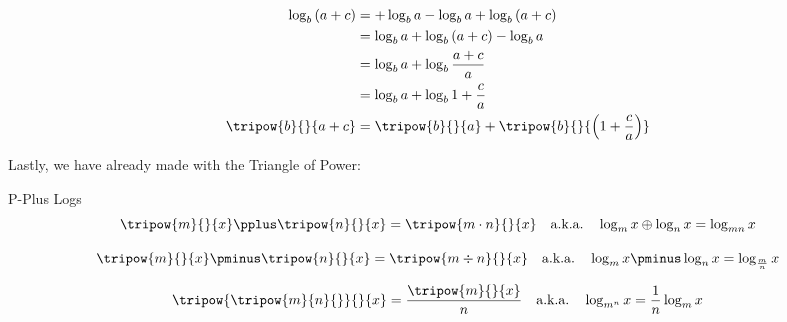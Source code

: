 \begin{align*}
	\log_b{(a+c)} 	&= + \log_b{a} - \log_b{a} + \log_b{(a+c)}\\
				&= \log_b{a} + \log_b{(a+c)} - \log_b{a}\\
				&= \log_b{a} + \log_b{\frac{a+c}{a}} \\
				&= \log_b{a} + \log_b{1 + \frac{c}{a}}\\
	\tripow{b}{}{a+c} &= \tripow{b}{}{a} + \tripow{b}{}{\left(1 + \frac{c}{a}\right)}
\end{align*}

Lastly, we have already made with the Triangle of Power:

\begin{derivation}{P-Plus Logs}
$$
\tripow{m}{}{x} \pplus \tripow{n}{}{x} = \tripow{m\cdot{}n}{}{x}
\quad \text{a.k.a.} \quad
\log_m{x} \oplus \log_n{x} = \log_{mn}{x}
$$

$$
\tripow{m}{}{x} \pminus \tripow{n}{}{x} = \tripow{m\div{}n}{}{x}
\quad \text{a.k.a.} \quad
\log_m{x} \pminus \log_n{x} = \log_{\frac{m}{n}}{x}
$$

$$
\tripow{\tripow{m}{n}{}}{}{x} = \frac{\tripow{m}{}{x}}{n}
\quad \text{a.k.a.} \quad
\log_{m^n}{x} = \frac{1}{n}\log_m{x}
$$
\end{derivation}
